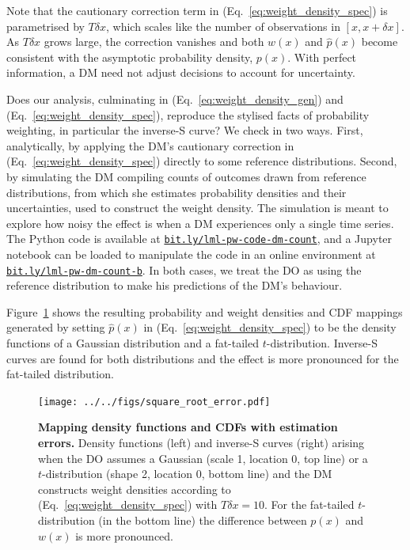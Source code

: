 \documentclass[12pt,letter,timesnewroman]{article}
\newcommand{\eref}[1]{(Eq.~\ref{eq:#1})}
\newcommand{\flabel}[1]{\label{fig:#1}}
\newcommand{\Fref}[1]{Figure~\ref{fig:#1}}
\newcommand{\phat}{\hat{p}}
\begin{document}
Note that the cautionary correction term in \eref{weight_density_spec} is parametrised by $T\delta x$, which scales like the number of observations in $[x, x+\delta x]$. As $T\delta x$ grows large, the correction vanishes and both $w(x)$ and $\phat(x)$ become consistent with the asymptotic probability density, $p(x)$. With perfect information, a DM need not adjust decisions to account for uncertainty.

Does our analysis, culminating in \eref{weight_density_gen} and \eref{weight_density_spec}, reproduce the stylised facts of probability weighting, in particular the inverse-S curve? We check in two ways. First, analytically, by applying the DM's cautionary correction in \eref{weight_density_spec} directly to some reference distributions. Second, by simulating the DM compiling counts of outcomes drawn from reference distributions, from which she estimates probability densities and their uncertainties, used to construct the weight density. The simulation is meant to explore how noisy the effect is when a DM experiences only a single time series. The Python code is available at \href{https://bit.ly/lml-pw-code-dm-count}{\texttt{bit.ly/lml-pw-code-dm-count}}, and a Jupyter notebook can be loaded to manipulate the code in an online environment at \href{https://bit.ly/lml-pw-dm-count-b}{\texttt{bit.ly/lml-pw-dm-count-b}}. In both cases, we treat the DO as using the reference distribution to make his predictions of the DM's behaviour.

\Fref{square_root_error} shows the resulting probability and weight densities and CDF mappings generated by setting $\phat(x)$ in \eref{weight_density_spec} to be the density functions of a Gaussian distribution and a fat-tailed $t$-distribution. Inverse-S curves are found for both distributions and the effect is more pronounced for the fat-tailed distribution.
\begin{figure}[!htb]
\centering
\texttt{[image: ../../figs/square\_root\_error.pdf]}
\caption{\textbf{Mapping density functions and CDFs with estimation errors.} Density functions (left) and inverse-S curves (right) arising when the DO assumes a Gaussian (scale 1, location 0, top line) or a $t$-distribution (shape 2, location 0, bottom line) and the DM constructs weight densities according to \eref{weight_density_spec} with $T\delta x=10$. For the fat-tailed $t$-distribution (in the bottom line) the difference between $p(x)$ and $w(x)$ is more pronounced.}
\flabel{square_root_error}
\end{figure}
\end{document}
